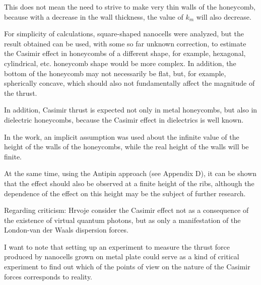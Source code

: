 \documentclass[twoside, 10pt]{article}
\begin{document}
\begin{multicols}{2}
    This does not mean the need to strive to make very thin walls of the
honeycomb, because with a decrease in the wall thickness, the value of
\(k_m\) will also decrease.

    For simplicity of calculations, square-shaped nanocells were analyzed,
but the result obtained can be used, with some so far unknown correction,
to estimate the Casimir effect in honeycombs of a different shape,
for example, hexagonal, cylindrical, etc. honeycomb shape would be more complex.
In addition, the bottom of the honeycomb may not necessarily be flat, but,
for example, spherically concave, which should also not fundamentally affect
the magnitude of the thrust.

    In addition, Casimir thrust is expected not only in metal honeycombs,
but also in dielectric honeycombs, because the Casimir effect in dielectrics
is well known.

    In the work, an implicit assumption was used about the infinite value of
the height of the walls of the honeycombs, while the real height of the
walls will be finite.

    At the same time, using the Antipin approach (see Appendix D), it can be
shown that the effect should also be observed at a finite height of the
ribs, although the dependence of the effect on this height may be the
subject of further research.

    Regarding criticism: Hrvoje \cite{Hrvoje2016} consider the Casimir
effect not as a consequence of the existence of virtual quantum photons,
but as only a manifestation of the London-van der Waals dispersion
forces.

    I want to note that setting up an experiment to measure the thrust force
produced by nanocells grown on metal plate could serve as a kind of critical
experiment to find out which of the points of view on the nature of the
Casimir forces corresponds to reality.

\end{multicols}
\end{document}
